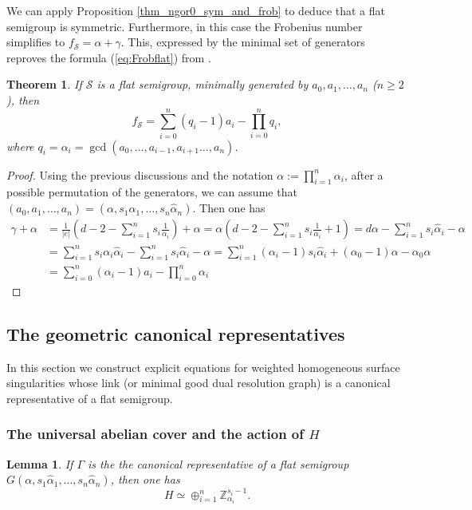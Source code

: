 \documentclass[oneside]{amsart}
\numberwithin{equation}{section}
\numberwithin{equation}{subsection}
\theoremstyle{plain}
\newtheorem{lemma}[equation]{Lemma}
\newtheorem{thm}[equation]{Theorem}
\theoremstyle{definition}
\def\Z{\mathbb Z}
\newcommand{\calS}{{\mathcal S}}\newcommand{\cals}{{\bf s}}\newcommand{\calst}{{\bf st}}\newcommand{\cS}{{\mathcal S}}
\newcommand{\al}{\alpha}
\renewcommand{\Z}{\mathbb{Z}}
\newcommand{\Se}{\mathcal{S}}
\newcommand{\z}[1]{\widehat{#1}}
\begin{document}
We can apply Proposition \ref{thm_ngor0_sym_and_frob} to deduce that a flat semigroup is symmetric. Furthermore, in this case the Frobenius number simplifies to $f_{\calS}=\alpha+\gamma$. This, expressed by the minimal set of generators reproves the formula (\ref{eq:Frobflat}) from \cite[Theorem 2.5]{art_rch}.

\begin{thm}\label{thm_flat_frob}
     If $\Se$ is a flat semigroup, minimally generated by $a_0,a_1,\dots,a_{n}$ ($n\geq 2$), then
    \begin{equation}
        \label{eq:frob_flat}
        f_{\calS}=\sum_{i=0}^{n}(q_i-1)a_i-\prod_{i=0}^{n} q_i,    
    \end{equation}
    where $q_i=\al_i=\gcd(a_0,\dots,a_{i-1},a_{i+1}\dots,a_{n})$.
 \end{thm} 
 \begin{proof}
 Using the previous discussions and the notation $\alpha:=\prod_{i=1}^n \al_i$, after a possible permutation of the generators, we can assume that
    $(a_0,a_1,\dots,a_{n})=(\al,s_1\z{\al}_1,\dots,s_n\z{\al}_n)$. Then one has
    \begin{align*}
     \gamma+\al&=\frac{1}{|e|}(d-2-\sum_{i=1}^n s_i\frac{1}{\al_i})+\al=\al(d-2-\sum_{i=1}^n s_i\frac{1}{\al_i}+1)=d\al-\sum_{i=1}^n s_i \widehat{\al}_i-\al\\ 
     &=\sum_{i=1}^n s_i \al_i\widehat{\al}_i-\sum_{i=1}^n s_i \widehat{\al}_i-\al=\sum_{i=1}^{n}(\al_i-1)s_i\widehat{\al}_i +(\al_{0}-1)\al-\al_{0}\al\\
     &=\sum_{i=0}^{n}(\al_i-1)a_i-\prod_{i=0}^{n} \al_i
    \end{align*}    
 \end{proof}



\subsection{The geometric canonical representatives}\label{s:ICIS}
In this section we construct explicit equations for weighted homogeneous surface singularities whose link (or minimal good dual resolution graph) is a canonical representative of a flat semigroup.
 
\subsubsection{\bf The universal abelian cover and the action of $H$}
\begin{lemma}\label{lem:H}
If $\Gamma$ is the the canonical representative of a flat semigroup $G(\al,s_1\z{\al}_1,\dots,s_n\z{\al}_n)$,  then  one has
$$H\simeq \oplus_{i=1}^n \Z_{\al_i}^{s_i-1}.$$
\end{lemma}
\end{document}
